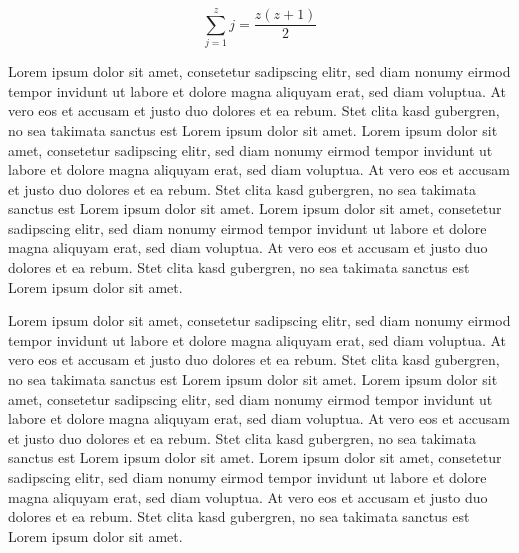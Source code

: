 \documentclass[journal]{vgtc}
\begin{document}
\begin{equation}
  \sum_{j=1}^{z} j = \frac{z(z+1)}{2}
\end{equation}

Lorem ipsum dolor sit amet, consetetur sadipscing elitr, sed diam
nonumy eirmod tempor invidunt ut labore et dolore magna aliquyam erat,
sed diam voluptua. At vero eos et accusam et justo duo dolores et ea
rebum. Stet clita kasd gubergren, no sea takimata sanctus est Lorem
ipsum dolor sit amet. Lorem ipsum dolor sit amet, consetetur
sadipscing elitr, sed diam nonumy eirmod tempor invidunt ut labore et
dolore magna aliquyam erat, sed diam voluptua. At vero eos et accusam
et justo duo dolores et ea rebum. Stet clita kasd gubergren, no sea
takimata sanctus est Lorem ipsum dolor sit amet. Lorem ipsum dolor sit
amet, consetetur sadipscing elitr, sed diam nonumy eirmod tempor
invidunt ut labore et dolore magna aliquyam erat, sed diam
voluptua. At vero eos et accusam et justo duo dolores et ea
rebum. Stet clita kasd gubergren, no sea takimata sanctus est Lorem
ipsum dolor sit amet.

Lorem ipsum dolor sit amet, consetetur sadipscing elitr, sed diam
nonumy eirmod tempor invidunt ut labore et dolore magna aliquyam erat,
sed diam voluptua. At vero eos et accusam et justo duo dolores et ea
rebum. Stet clita kasd gubergren, no sea takimata sanctus est Lorem
ipsum dolor sit amet. Lorem ipsum dolor sit amet, consetetur
sadipscing elitr, sed diam nonumy eirmod tempor invidunt ut labore et
dolore magna aliquyam erat, sed diam voluptua. At vero eos et accusam
et justo duo dolores et ea rebum. Stet clita kasd gubergren, no sea
takimata sanctus est Lorem ipsum dolor sit amet. Lorem ipsum dolor sit
amet, consetetur sadipscing elitr, sed diam nonumy eirmod tempor
invidunt ut labore et dolore magna aliquyam erat, sed diam
voluptua. At vero eos et accusam et justo duo dolores et ea
rebum. Stet clita kasd gubergren, no sea takimata sanctus est Lorem
ipsum dolor sit amet.
\end{document}
